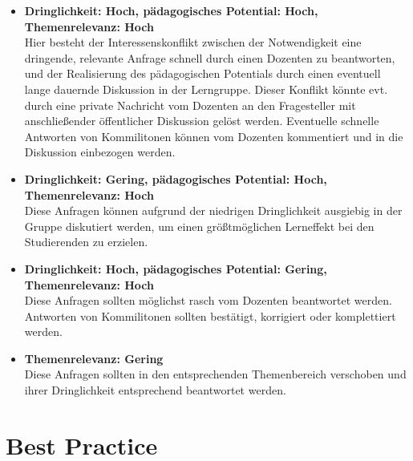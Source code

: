 \begin{itemize}
	\item \textbf{Dringlichkeit: Hoch, pädagogisches Potential: Hoch, \\Themenrelevanz: Hoch}\\
				Hier besteht der Interessenskonflikt zwischen der Notwendigkeit eine dringende, relevante Anfrage schnell durch einen Dozenten zu beantworten, 
				und der Realisierung des pädagogischen Potentials durch einen eventuell lange dauernde Diskussion in der Lerngruppe. 
				Dieser Konflikt könnte evt. durch eine private Nachricht vom Dozenten an den Fragesteller mit anschließender öffentlicher Diskussion gelöst werden.
				Eventuelle schnelle Antworten von Kommilitonen können vom Dozenten kommentiert und in die Diskussion einbezogen werden.
				
	\item \textbf{Dringlichkeit: Gering, pädagogisches Potential: Hoch, \\Themenrelevanz: Hoch}\\
				Diese Anfragen können aufgrund der niedrigen Dringlichkeit ausgiebig in der Gruppe diskutiert werden, um einen größtmöglichen Lerneffekt bei den Studierenden zu erzielen.
				
	\item \textbf{Dringlichkeit: Hoch, pädagogisches Potential: Gering, \\Themenrelevanz: Hoch}\\
				Diese Anfragen sollten möglichst rasch vom Dozenten beantwortet werden. Antworten von Kommilitonen sollten bestätigt, korrigiert oder komplettiert werden.
				
	\item \textbf{Themenrelevanz: Gering}\\
				Diese Anfragen sollten in den entsprechenden Themenbereich verschoben und ihrer Dringlichkeit entsprechend beantwortet werden.
\end{itemize}



\newpage
\section{Best Practice} %
\label{sec:best_practice}

